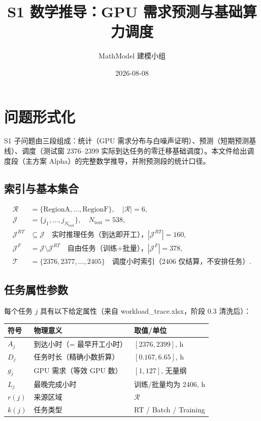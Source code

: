 \documentclass{internal-report}
\title{S1 数学推导：GPU 需求预测与基础算力调度}
\author{MathModel 建模小组}
\date{2026-08-08}
\begin{document}
\maketitle

\section{问题形式化}

S1 子问题由三段组成：统计（GPU 需求分布与白噪声证明）、预测（短期预测基线）、调度（测试窗 2376--2399 实际到达任务的零迁移基础调度）。本文件给出调度段（主方案 Alpha）的完整数学推导，并附预测段的统计口径。

\subsection{索引与基本集合}

\begin{align}
  \mathcal{R} &= \{\text{RegionA},\ldots,\text{RegionF}\},\quad |\mathcal{R}|=6, \label{eq:regions}\\
  \mathcal{J} &= \{j_1,\ldots,j_{N_{\text{test}}}\},\quad N_{\text{test}}=538, \label{eq:tasks}\\
  \mathcal{J}^{RT} &\subseteq \mathcal{J} \quad\text{实时推理任务（到达即开工），} |\mathcal{J}^{RT}|=160,\\
  \mathcal{J}^{F} &= \mathcal{J} \setminus \mathcal{J}^{RT} \quad\text{自由任务（训练+批量），} |\mathcal{J}^{F}|=378,\\
  \mathcal{T} &= \{2376,2377,\ldots,2405\} \quad\text{调度小时索引（2406 仅结算，不安排任务）}.
\end{align}

\subsection{任务属性参数}

每个任务 $j$ 具有以下给定属性（来自 workload\_trace.xlsx，阶段 0.3 清洗后）：

\begin{center}
\footnotesize
\begin{tabular}{lll}
\toprule
符号 & 物理意义 & 取值/单位 \\
\midrule
$A_j$ & 到达小时（= 最早开工小时） & $[2376,2399]$, h \\
$D_j$ & 任务时长（精确小数折算） & $[0.167,6.65]$, h \\
$g_j$ & GPU 需求（等效 GPU 数） & $[1,127]$, 无量纲 \\
$L_j$ & 最晚完成小时 & 训练/批量均为 2406, h \\
$r(j)$ & 来源区域 & $\mathcal{R}$ \\
$k(j)$ & 任务类型 & RT / Batch / Training \\
\bottomrule
\end{tabular}
\end{center}
\end{document}
